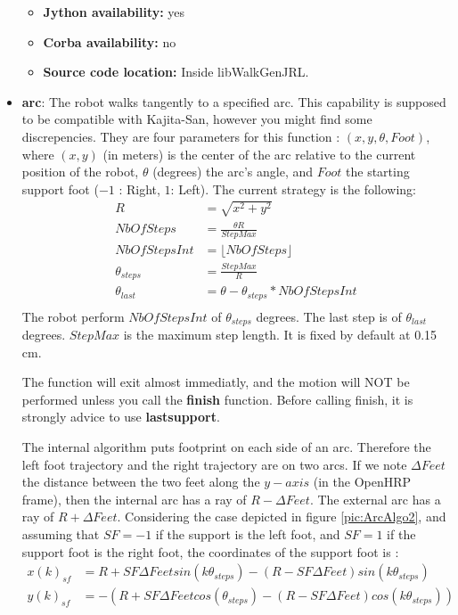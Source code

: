 \begin{itemize}
\begin{itemize}
\item \textbf{Jython availability:} yes
\item \textbf{Corba availability:} no
\item \textbf{Source code location:} Inside libWalkGenJRL.
\end{itemize}

\item {\bf arc}: The robot walks tangently to a specified arc.
This capability is supposed to be compatible with Kajita-San, however you might find 
some discrepencies. They are four parameters for this function : $(x,y,\theta,Foot)$,
where $(x,y)$ (in meters) is the center of the arc relative to the current position of the robot,
$\theta$ (degrees) the arc's angle, and $Foot$ the starting support foot ($-1$ : Right, $1$: Left).
The current strategy is the following:
\begin{equation}
\begin{aligned}
R &= \sqrt{x^2+y^2} \\
NbOfSteps &= \frac{\theta R }{StepMax} \\
NbOfStepsInt &= \lfloor NbOfSteps \rfloor \\
\theta_{steps} &= \frac{StepMax}{R} \\
\theta_{last} &= \theta - \theta_{steps} * NbOfStepsInt \\
\end{aligned}
\end{equation}
The robot perform $NbOfStepsInt$ of $\theta_{steps}$ degrees.
The last step is of $\theta_{last}$ degrees.
$StepMax$ is the maximum step length. It is fixed by default at 0.15 cm.
\par
The function will exit almost immediatly, and the motion will NOT
be performed unless you call the {\bf finish} function.
Before calling finish, it is strongly advice to use {\bf lastsupport}.

The internal algorithm puts footprint on each side of an arc.
Therefore the left foot trajectory and the right trajectory are on two arcs.
If we note $\Delta Feet$ the distance between the two feet along the $y-axis$ 
(in the OpenHRP frame), then the internal arc has a ray of $R - \Delta Feet$.
The external arc has a ray of $R + \Delta Feet$.
Considering the case depicted in figure \ref{pic:ArcAlgo2},
and assuming that $SF= -1$ if the support is the left foot,
and $SF=1$ if the support foot is the right foot, the coordinates
of the support foot is :	
\begin{equation*}
\begin{aligned}
x(k)_{sf} &= R + SF  \Delta Feet  sin(k \theta_{steps}) - (R-SF \Delta Feet ) sin(k \theta_{steps}) \\
y(k)_{sf} &= -(R + SF  \Delta Feet  cos(\theta_{steps}) - (R-SF \Delta Feet ) cos(k \theta_{steps}) )\\
\end{aligned}
\end{equation*}


\end{itemize}
